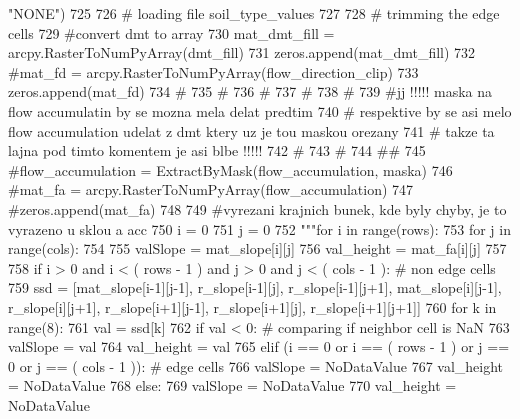 \begin{DoxyCode}
{       "NONE")
}
725 
726   \textcolor{comment}{# loading file soil\_type\_values
}
727 
728   \textcolor{comment}{# trimming the edge cells
}
729   \textcolor{comment}{#convert dmt to array
}
730   mat\_dmt\_fill = arcpy.RasterToNumPyArray(dmt\_fill)
731   zeros.append(mat\_dmt\_fill)
732   \textcolor{comment}{#mat\_fd = arcpy.RasterToNumPyArray(flow\_direction\_clip)
}
733   zeros.append(mat\_fd)
734   \textcolor{comment}{#
}
735   \textcolor{comment}{#
}
736   \textcolor{comment}{#
}
737   \textcolor{comment}{#
}
738   \textcolor{comment}{#
}
739   \textcolor{comment}{#jj !!!!! maska na flow accumulatin by se mozna mela delat predtim
}
740   \textcolor{comment}{#         respektive by se asi melo flow accumulation udelat z dmt ktery uz je tou maskou orezany
}
741   \textcolor{comment}{#         takze ta lajna pod timto komentem je asi blbe !!!!!
}
742   \textcolor{comment}{#
}
743   \textcolor{comment}{#
}
744   \textcolor{comment}{##
}
745   \textcolor{comment}{#flow\_accumulation = ExtractByMask(flow\_accumulation, maska)
}
746   \textcolor{comment}{#mat\_fa = arcpy.RasterToNumPyArray(flow\_accumulation)
}
747   \textcolor{comment}{#zeros.append(mat\_fa)
}
748 
749   \textcolor{comment}{#vyrezani krajnich bunek, kde byly chyby, je to vyrazeno u sklou a acc
}
750   i = 0
751   j = 0
752   \textcolor{stringliteral}{"""for i in range(rows):
}
753 \textcolor{stringliteral}{    for j in range(cols):
}
754 \textcolor{stringliteral}{
}
755 \textcolor{stringliteral}{      valSlope = mat\_slope[i][j]
}
756 \textcolor{stringliteral}{      val\_height = mat\_fa[i][j]
}
757 \textcolor{stringliteral}{
}
758 \textcolor{stringliteral}{      if i > 0 and i < ( rows - 1 ) and j > 0 and j < ( cols - 1 ): # non edge cells
}
759 \textcolor{stringliteral}{  ssd = [mat\_slope[i-1][j-1], r\_slope[i-1][j], r\_slope[i-1][j+1], mat\_slope[i][j-1], r\_slope[i][j+1],
       r\_slope[i+1][j-1], r\_slope[i+1][j], r\_slope[i+1][j+1]]
}
760 \textcolor{stringliteral}{  for k in range(8):
}
761 \textcolor{stringliteral}{    val = ssd[k]
}
762 \textcolor{stringliteral}{    if val < 0: # comparing if neighbor cell is NaN
}
763 \textcolor{stringliteral}{      valSlope = val
}
764 \textcolor{stringliteral}{      val\_height = val
}
765 \textcolor{stringliteral}{      elif (i == 0 or i == ( rows - 1 ) or j == 0 or j == ( cols - 1 )): # edge cells
}
766 \textcolor{stringliteral}{  valSlope = NoDataValue
}
767 \textcolor{stringliteral}{  val\_height = NoDataValue
}
768 \textcolor{stringliteral}{      else:
}
769 \textcolor{stringliteral}{  valSlope = NoDataValue
}
770 \textcolor{stringliteral}{  val\_height = NoDataValue
}
\end{DoxyCode}
